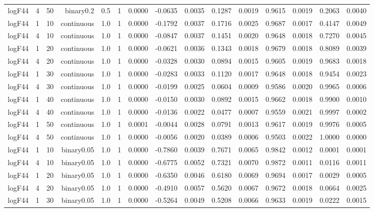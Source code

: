 \begin{longtable}{rrrrrrrrrrrrrrr}
  logF44 & 4 & 50 & binary0.2 & 0.5 & 1 & 0.0000 & -0.0635 & 0.0035 & 0.1287 & 0.0019 & 0.9615 & 0.0019 & 0.2063 & 0.0040 \\ 
  logF44 & 1 & 10 & continuous & 1.0 & 1 & 0.0000 & -0.1792 & 0.0037 & 0.1716 & 0.0025 & 0.9687 & 0.0017 & 0.4147 & 0.0049 \\ 
  logF44 & 4 & 10 & continuous & 1.0 & 1 & 0.0000 & -0.0847 & 0.0037 & 0.1451 & 0.0020 & 0.9648 & 0.0018 & 0.7270 & 0.0045 \\ 
  logF44 & 1 & 20 & continuous & 1.0 & 1 & 0.0000 & -0.0621 & 0.0036 & 0.1343 & 0.0018 & 0.9679 & 0.0018 & 0.8089 & 0.0039 \\ 
  logF44 & 4 & 20 & continuous & 1.0 & 1 & 0.0000 & -0.0328 & 0.0030 & 0.0894 & 0.0015 & 0.9605 & 0.0019 & 0.9683 & 0.0018 \\ 
  logF44 & 1 & 30 & continuous & 1.0 & 1 & 0.0000 & -0.0283 & 0.0033 & 0.1120 & 0.0017 & 0.9648 & 0.0018 & 0.9454 & 0.0023 \\ 
  logF44 & 4 & 30 & continuous & 1.0 & 1 & 0.0000 & -0.0199 & 0.0025 & 0.0604 & 0.0009 & 0.9586 & 0.0020 & 0.9965 & 0.0006 \\ 
  logF44 & 1 & 40 & continuous & 1.0 & 1 & 0.0000 & -0.0150 & 0.0030 & 0.0892 & 0.0015 & 0.9662 & 0.0018 & 0.9900 & 0.0010 \\ 
  logF44 & 4 & 40 & continuous & 1.0 & 1 & 0.0000 & -0.0136 & 0.0022 & 0.0477 & 0.0007 & 0.9559 & 0.0021 & 0.9997 & 0.0002 \\ 
  logF44 & 1 & 50 & continuous & 1.0 & 1 & 0.0001 & -0.0044 & 0.0028 & 0.0791 & 0.0013 & 0.9617 & 0.0019 & 0.9976 & 0.0005 \\ 
  logF44 & 4 & 50 & continuous & 1.0 & 1 & 0.0000 & -0.0056 & 0.0020 & 0.0389 & 0.0006 & 0.9503 & 0.0022 & 1.0000 & 0.0000 \\ 
  logF44 & 1 & 10 & binary0.05 & 1.0 & 1 & 0.0000 & -0.7860 & 0.0039 & 0.7671 & 0.0065 & 0.9842 & 0.0012 & 0.0001 & 0.0001 \\ 
  logF44 & 4 & 10 & binary0.05 & 1.0 & 1 & 0.0000 & -0.6775 & 0.0052 & 0.7321 & 0.0070 & 0.9872 & 0.0011 & 0.0116 & 0.0011 \\ 
  logF44 & 1 & 20 & binary0.05 & 1.0 & 1 & 0.0000 & -0.6350 & 0.0046 & 0.6180 & 0.0069 & 0.9694 & 0.0017 & 0.0029 & 0.0005 \\ 
  logF44 & 4 & 20 & binary0.05 & 1.0 & 1 & 0.0000 & -0.4910 & 0.0057 & 0.5620 & 0.0067 & 0.9672 & 0.0018 & 0.0664 & 0.0025 \\ 
  logF44 & 1 & 30 & binary0.05 & 1.0 & 1 & 0.0000 & -0.5264 & 0.0049 & 0.5208 & 0.0066 & 0.9633 & 0.0019 & 0.0222 & 0.0015 \\ 

\end{longtable}
